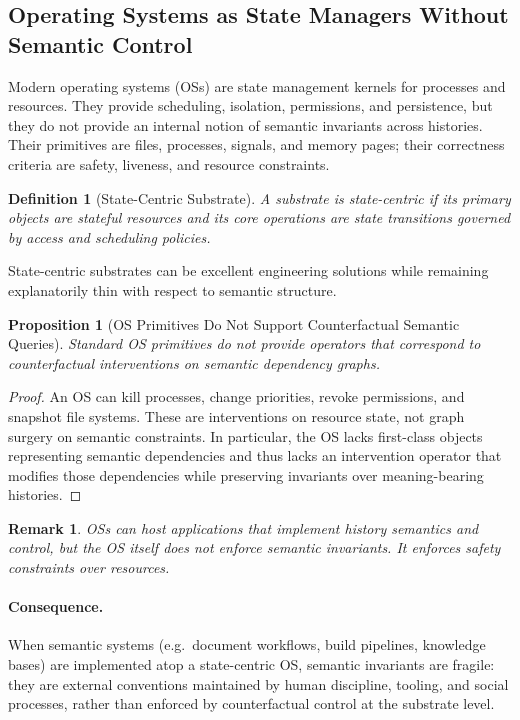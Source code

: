 \documentclass[11pt]{article}
\newtheorem{definition}{Definition}
\newtheorem{remark}{Remark}
\newtheorem{proposition}{Proposition}
\begin{document}
\subsection{Operating Systems as State Managers Without Semantic Control}

Modern operating systems (OSs) are state management kernels for processes and resources. They provide scheduling, isolation, permissions, and persistence, but they do not provide an internal notion of semantic invariants across histories. Their primitives are files, processes, signals, and memory pages; their correctness criteria are safety, liveness, and resource constraints.

\begin{definition}[State-Centric Substrate]
A substrate is \emph{state-centric} if its primary objects are stateful resources and its core operations are state transitions governed by access and scheduling policies.
\end{definition}

State-centric substrates can be excellent engineering solutions while remaining explanatorily thin with respect to semantic structure.

\begin{proposition}[OS Primitives Do Not Support Counterfactual Semantic Queries]
Standard OS primitives do not provide operators that correspond to counterfactual interventions on semantic dependency graphs.
\end{proposition}

\begin{proof}
An OS can kill processes, change priorities, revoke permissions, and snapshot file systems. These are interventions on resource state, not graph surgery on semantic constraints. In particular, the OS lacks first-class objects representing semantic dependencies and thus lacks an intervention operator that modifies those dependencies while preserving invariants over meaning-bearing histories.
\end{proof}

\begin{remark}
OSs can host applications that implement history semantics and control, but the OS itself does not enforce semantic invariants. It enforces safety constraints over resources.
\end{remark}

\paragraph{Consequence.}
When semantic systems (e.g.\ document workflows, build pipelines, knowledge bases) are implemented atop a state-centric OS, semantic invariants are fragile: they are external conventions maintained by human discipline, tooling, and social processes, rather than enforced by counterfactual control at the substrate level.
\end{document}
